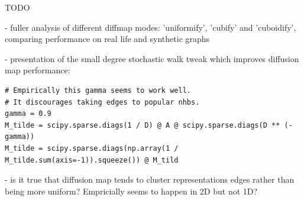 TODO 

- fuller analysis of different diffmap modes: 'uniformify', 'cubify' and 'cuboidify', comparing performance on real life and synthetic graphs

- presentation of the small degree stochastic walk tweak which improves diffusion map performance:
\begin{verbatim}
# Empirically this gamma seems to work well. 
# It discourages taking edges to popular nhbs.
gamma = 0.9
M_tilde = scipy.sparse.diags(1 / D) @ A @ scipy.sparse.diags(D ** (-gamma))
M_tilde = scipy.sparse.diags(np.array(1 / M_tilde.sum(axis=-1)).squeeze()) @ M_tild
\end{verbatim}

- is it true that diffusion map tends to cluster representations edges rather than being more uniform? Empricially seems to happen in 2D but not 1D?

